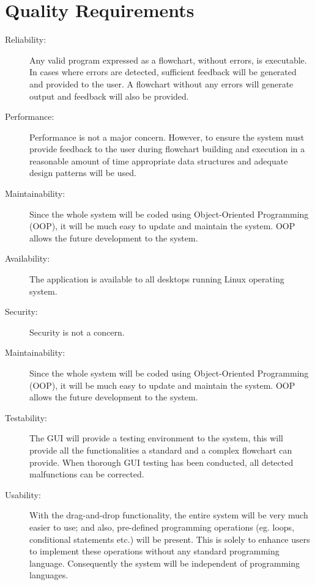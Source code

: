 \documentclass[12pt]{article}
\begin{document}
\section{Quality Requirements}
\begin{description}
  \item[Reliability:]
  	Any valid program expressed as a flowchart, without errors, is executable. In cases where errors are detected, sufficient feedback will be generated and provided to the user. A flowchart without any errors will generate output and feedback will also be provided.
 

  \item[Performance:]
  Performance is not a major concern. However, to ensure the system must provide feedback to the user during flowchart building and execution in a reasonable amount of time appropriate data structures and adequate design patterns will be used.

  \item[Maintainability:] 
  Since the whole system will be coded using Object-Oriented Programming (OOP), it will be much easy to update and maintain the system. OOP allows the future development to the system.

  \item[Availability:]
  The application is available to all desktops running Linux operating system.

  \item[Security:]
  Security is not a concern.

  \item[Maintainability:]
  	Since the whole system will be coded using Object-Oriented Programming (OOP), it will be much easy to update and maintain the system. OOP allows the future development to the system.


  \item[Testability:]
  The GUI will provide a testing environment to the system, this will provide all the functionalities a standard and a complex flowchart can provide. When thorough GUI testing has been conducted, all detected malfunctions can be corrected.

  \item[Usability:]
  With the drag-and-drop functionality, the entire system will be very much easier to use; and also, pre-defined programming operations (eg. loops, conditional statements etc.) will be present. This is solely to enhance users to implement these operations without any standard programming language. Consequently the system will be independent of programming languages.
  

\end{description}
\end{document}
